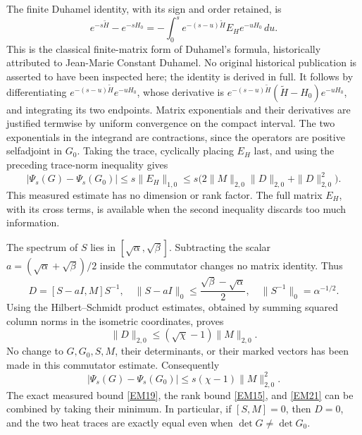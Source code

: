 \documentclass[11pt]{article}
\begin{document}
The finite Duhamel identity, with its sign and order retained, is
\begin{equation}
 e^{-s\widetilde H}-e^{-sH_0}
 =-\int_0^s e^{-(s-u)\widetilde H} E_H e^{-uH_0}\,du.
 \tag{EM18}\label{EM18}
\end{equation}
This is the classical finite-matrix form of Duhamel's formula, historically
attributed to Jean-Marie Constant Duhamel. No original historical publication
is asserted to have been inspected here; the identity is derived in full.
It follows by differentiating
\(e^{-(s-u)\widetilde H}e^{-uH_0}\), whose derivative is
\(e^{-(s-u)\widetilde H}(\widetilde H-H_0)e^{-uH_0}\), and integrating
its two endpoints. Matrix exponentials and their derivatives are
justified termwise by uniform convergence on the compact interval.
The two exponentials in the integrand are contractions, since the
operators are positive selfadjoint in \(G_0\). Taking the trace,
cyclically placing \(E_H\) last, and using the preceding trace-norm
inequality gives
\begin{equation}
 |\Psi_s(G)-\Psi_s(G_0)|\le s\|E_H\|_{1,0}
 \le s\bigl(2\|M\|_{2,0}\|D\|_{2,0}+\|D\|_{2,0}^2\bigr).
 \tag{EM19}\label{EM19}
\end{equation}
This measured estimate has no dimension or rank factor. The full
matrix \(E_H\), with its cross terms, is available when the second
inequality discards too much information.

The spectrum of \(S\) lies in \([\sqrt\alpha,\sqrt\beta]\).
Subtracting the scalar \(a=(\sqrt\alpha+\sqrt\beta)/2\) inside the
commutator changes no matrix identity. Thus
\[
 D=[S-aI,M]S^{-1},\quad
 \|S-aI\|_0\le\frac{\sqrt\beta-\sqrt\alpha}{2},\quad
 \|S^{-1}\|_0=\alpha^{-1/2}.
\]
Using the Hilbert--Schmidt product estimates, obtained by summing
squared column norms in the isometric coordinates, proves
\begin{equation}
 \|D\|_{2,0}\le(\sqrt\chi-1)\|M\|_{2,0}.
 \tag{EM20}\label{EM20}
\end{equation}
No change to \(G,G_0,S,M\), their determinants, or their marked
vectors has been made in this commutator estimate.
Consequently
\begin{equation}
 |\Psi_s(G)-\Psi_s(G_0)|
 \le s(\chi-1)\|M\|_{2,0}^2.
 \tag{EM21}\label{EM21}
\end{equation}
The exact measured bound \eqref{EM19}, the rank bound \eqref{EM15},
and \eqref{EM21} can be combined by taking their minimum.
In particular, if \([S,M]=0\), then \(D=0\), and the two heat traces
are exactly equal even when \(\det G\ne\det G_0\).
\end{document}
